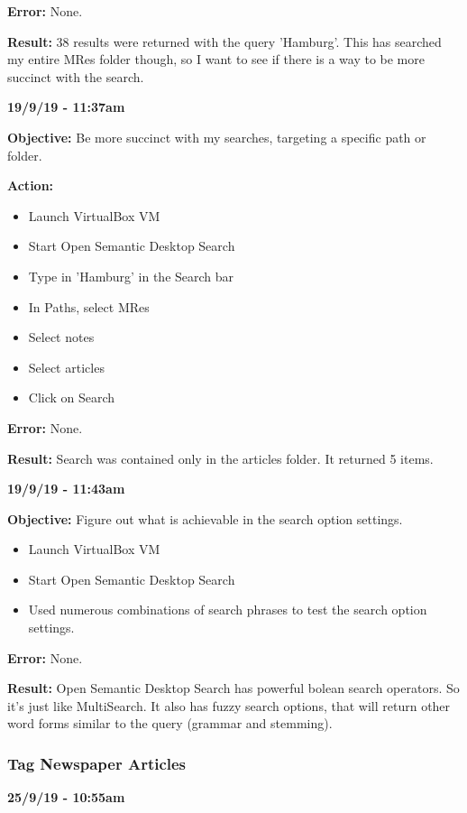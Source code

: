 \documentclass{article}
\begin{document}
\textbf{Error:} None.

\textbf{Result:} 38 results were returned with the query 'Hamburg'. This has searched my entire MRes folder though, so I want to see if there is a way to be more succinct with the search.

\textbf{19/9/19 - 11:37am}

\textbf{Objective:} Be more succinct with my searches, targeting a specific path or folder.

\textbf{Action:}
\begin{itemize}
    \item Launch VirtualBox VM
    \item Start Open Semantic Desktop Search
    \item Type in 'Hamburg' in the Search bar
    \item In Paths, select MRes
    \item Select notes
    \item Select articles
    \item Click on Search
\end{itemize}

\textbf{Error:} None.

\textbf{Result:} Search was contained only in the articles folder. It returned 5 items.

\textbf{19/9/19 - 11:43am}

\textbf{Objective:} Figure out what is achievable in the search option settings.

\begin{itemize}
    \item Launch VirtualBox VM
    \item Start Open Semantic Desktop Search
    \item Used numerous combinations of search phrases to test the search option settings.
\end{itemize}

\textbf{Error:} None.

\textbf{Result:} Open Semantic Desktop Search has powerful bolean search operators. So it's just like MultiSearch. It also has fuzzy search options, that will return other word forms similar to the query (grammar and stemming).

\subsubsection{Tag Newspaper Articles}

\textbf{25/9/19 - 10:55am}
\end{document}

